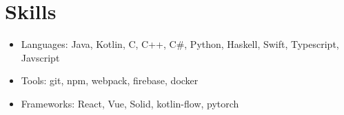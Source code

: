 \documentclass[10pt, a4paper]{article}
\begin{document}
\vspace{-0.2in}

\section*{Skills}
\begin{itemize}
  \item Languages: Java, Kotlin, C, C++, C\#, Python, Haskell, Swift, Typescript, Javscript
        \vspace{-0.1in}
  \item Tools: git, npm, webpack, firebase, docker
        \vspace{-0.1in}
  \item Frameworks: React, Vue, Solid, kotlin-flow, pytorch
\end{itemize}
\end{document}
